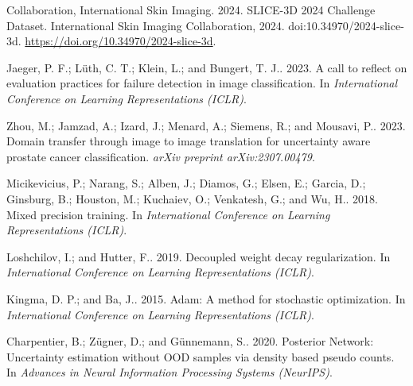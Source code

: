 Collaboration, International Skin Imaging. 2024. 
\newblock SLICE-3D 2024 Challenge Dataset. International Skin Imaging Collaboration, 2024. doi:10.34970/2024-slice-3d. \url{https://doi.org/10.34970/2024-slice-3d}.

Jaeger, P. F.; L{\"u}th, C. T.; Klein, L.; and Bungert, T. J.. 2023. 
\newblock A call to reflect on evaluation practices for failure detection in image classification. In {\em International Conference on Learning Representations (ICLR)}.

Zhou, M.; Jamzad, A.; Izard, J.; Menard, A.; Siemens, R.; and Mousavi, P.. 2023. 
\newblock Domain transfer through image to image translation for uncertainty aware prostate cancer classification. {\em arXiv preprint arXiv:2307.00479}.

Micikevicius, P.; Narang, S.; Alben, J.; Diamos, G.; Elsen, E.; Garcia, D.; Ginsburg, B.; Houston, M.; Kuchaiev, O.; Venkatesh, G.; and Wu, H.. 2018. 
\newblock Mixed precision training. In {\em International Conference on Learning Representations (ICLR)}.

Loshchilov, I.; and Hutter, F.. 2019. 
\newblock Decoupled weight decay regularization. In {\em International Conference on Learning Representations (ICLR)}.

Kingma, D. P.; and Ba, J.. 2015. 
\newblock Adam: A method for stochastic optimization. In {\em International Conference on Learning Representations (ICLR)}.

Charpentier, B.; Z{\"u}gner, D.; and G{\"u}nnemann, S.. 2020. 
\newblock Posterior Network: Uncertainty estimation without OOD samples via density based pseudo counts. In {\em Advances in Neural Information Processing Systems (NeurIPS)}.
